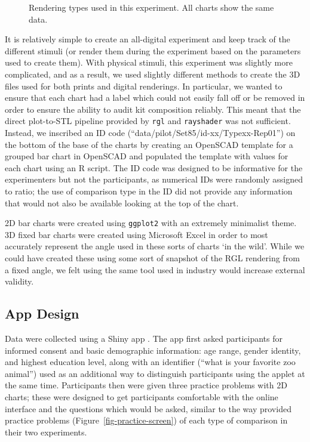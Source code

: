\documentclass[runningheads
]{llncs}
\begin{document}
\begin{figure}
\begin{minipage}[t]{0.25\linewidth}
{}

\end{minipage}%

\caption{\label{fig-chart-types}Rendering types used in this experiment.
All charts show the same data.}

\end{figure}%

It is relatively simple to create an all-digital experiment and keep
track of the different stimuli (or render them during the experiment
based on the parameters used to create them). With physical stimuli,
this experiment was slightly more complicated, and as a result, we used
slightly different methods to create the 3D files used for both prints
and digital renderings. In particular, we wanted to ensure that each
chart had a label which could not easily fall off or be removed in order
to ensure the ability to audit kit composition reliably. This meant that
the direct plot-to-STL pipeline provided by \texttt{rgl} \autocite{rgl}
and \texttt{rayshader} \autocite{rayshader} was not sufficient. Instead,
we inscribed an ID code (``data/pilot/Set85/id-xx/Typexx-Rep01'') on the
bottom of the base of the charts by creating an OpenSCAD
\autocite{mariuskintelOpenSCADDocumentation2023} template for a grouped
bar chart in OpenSCAD and populated the template with values for each
chart using an R script. The ID code was designed to be informative for
the experimenters but not the participants, as numerical IDs were
randomly assigned to ratio; the use of comparison type in the ID did not
provide any information that would not also be available looking at the
top of the chart.

2D bar charts were created using \texttt{ggplot2} \autocite{ggplot2}
with an extremely minimalist theme. 3D fixed bar charts were created
using Microsoft Excel in order to most accurately represent the angle
used in these sorts of charts `in the wild'. While we could have created
these using some sort of snapshot of the RGL rendering from a fixed
angle, we felt using the same tool used in industry would increase
external validity.

\subsection{App Design}\label{app-design}

Data were collected using a Shiny app \autocite{shiny}. The app first
asked participants for informed consent and basic demographic
information: age range, gender identity, and highest education level,
along with an identifier (``what is your favorite zoo animal'') used as
an additional way to distinguish participants using the applet at the
same time. Participants then were given three practice problems with 2D
charts; these were designed to get participants comfortable with the
online interface and the questions which would be asked, similar to the
way \textcite{clevelandGraphicalPerceptionTheory1984} provided practice
problems (Figure~\ref{fig-practice-screen}) of each type of comparison
in their two experiments.
\end{document}
